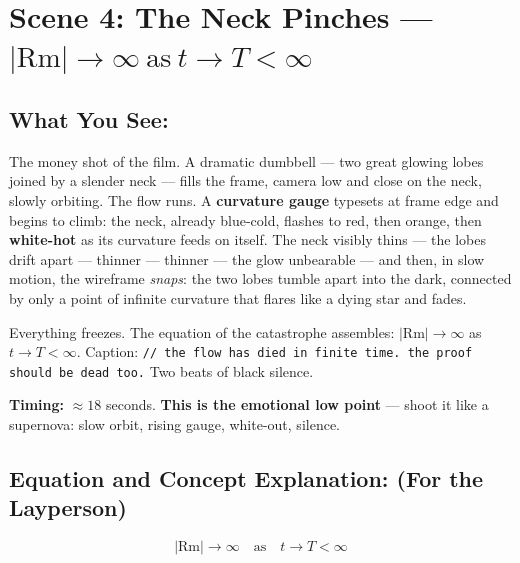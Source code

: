 \documentclass[11pt]{article}
\begin{document}
\section*{Scene 4: The Neck Pinches --- \( |\mathrm{Rm}| \to \infty \ \text{as}\ t \to T < \infty \)}

\subsection*{What You See:}

The money shot of the film. A dramatic dumbbell --- two great glowing lobes joined by
a slender neck --- fills the frame, camera low and close on the neck, slowly orbiting.
The flow runs. A \textbf{curvature gauge} typesets at frame edge and begins to climb:
the neck, already blue-cold, flashes to red, then orange, then \textbf{white-hot} as
its curvature feeds on itself. The neck visibly thins --- the lobes drift apart ---
thinner --- thinner --- the glow unbearable --- and then, in slow motion, the wireframe
\emph{snaps}: the two lobes tumble apart into the dark, connected by only a point of
infinite curvature that flares like a dying star and fades.

Everything freezes. The equation of the catastrophe assembles:
\( |\mathrm{Rm}| \to \infty \) as \( t \to T < \infty \). Caption:
\texttt{// the flow has died in finite time. the proof should be dead too.}
Two beats of black silence.

\textbf{Timing:} $\approx 18$ seconds. \textbf{This is the emotional low point} ---
shoot it like a supernova: slow orbit, rising gauge, white-out, silence.

\subsection*{Equation and Concept Explanation: (For the Layperson)}

\[
|\mathrm{Rm}| \longrightarrow \infty \quad \text{as} \quad t \to T < \infty
\]
\end{document}
